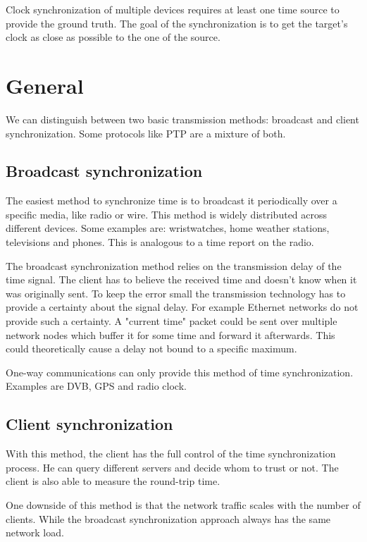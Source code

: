 Clock synchronization of multiple devices requires at least one time source to provide the ground truth. The goal of the synchronization is to get the target's clock as close as possible to the one of the source.

\section{General}

We can distinguish between two basic transmission methods: broadcast and client synchronization. Some protocols like PTP are a mixture of both.

\subsection{Broadcast synchronization}

The easiest method to synchronize time is to broadcast it periodically over a specific media, like radio or wire. This method is widely distributed across different devices. Some examples are: wristwatches, home weather stations, televisions and phones. This is analogous to a time report on the radio.

The broadcast synchronization method relies on the transmission delay of the time signal. The client has to believe the received time and doesn't know when it was originally sent. To keep the error small the transmission technology has to provide a certainty about the signal delay. For example Ethernet networks do not provide such a certainty. A "current time" packet could be sent over multiple network nodes which buffer it for some time and forward it afterwards. This could theoretically cause a delay not bound to a specific maximum.

One-way communications can only provide this method of time synchronization. Examples are DVB, GPS and radio clock.

\subsection{Client synchronization}

With this method, the client has the full control of the time synchronization process. He can query different servers and decide whom to trust or not. The client is also able to measure the round-trip time.

One downside of this method is that the network traffic scales with the number of clients. While the broadcast synchronization approach always has the same network load.

